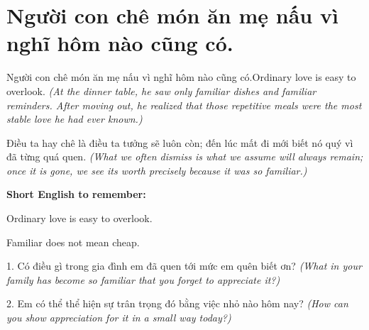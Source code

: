 \section{Người con chê món ăn mẹ nấu vì nghĩ hôm nào cũng có.}
\begin{truyen}{Người con chê món ăn mẹ nấu vì nghĩ hôm nào cũng có.}{Ordinary love is easy to overlook.}
\textit{(At the dinner table, he saw only familiar dishes and familiar reminders. After moving out, he realized that those repetitive meals were the most stable love he had ever known.)}
\end{truyen}
\begin{baihoc}
Điều ta hay chê là điều ta tưởng sẽ luôn còn; đến lúc mất đi mới biết nó quý vì đã từng quá quen.
\textit{(What we often dismiss is what we assume will always remain; once it is gone, we see its worth precisely because it was so familiar.)}
\end{baihoc}
\begin{ghinhoanh}
\textbf{Short English to remember:}

Ordinary love is easy to overlook.

Familiar does not mean cheap.
\end{ghinhoanh}
\begin{tuhocnhanh}
1. Có điều gì trong gia đình em đã quen tới mức em quên biết ơn? \textit{(What in your family has become so familiar that you forget to appreciate it?)}

2. Em có thể thể hiện sự trân trọng đó bằng việc nhỏ nào hôm nay? \textit{(How can you show appreciation for it in a small way today?)}
\end{tuhocnhanh}
\ngancach

